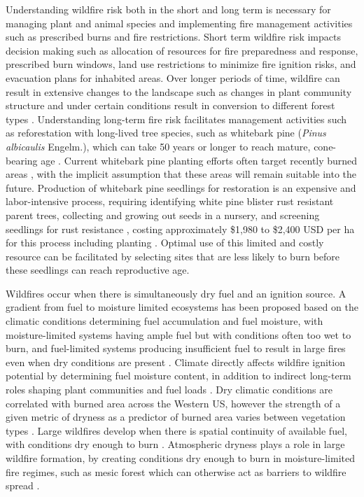 \documentclass[11p]{article}
\begin{document}
Understanding wildfire risk both in the short and long term is necessary for managing plant and animal species and implementing fire management activities such as prescribed burns and fire restrictions. Short term wildfire risk impacts decision making such as allocation of resources for fire preparedness and response, prescribed burn windows, land use restrictions to minimize fire ignition risks, and evacuation plans for inhabited areas. Over longer periods of time, wildfire can result in extensive changes to the landscape such as changes in plant community structure and under certain conditions result in conversion to different forest types \citep{coopWildfireDrivenForestConversion2020}. Understanding long-term fire risk facilitates management activities such as reforestation with long-lived tree species, such as whitebark pine (\textit{Pinus albicaulis} Engelm.), which can take 50 years or longer to reach mature, cone-bearing age \citep{tombackWhitebarkPineCommunities2001}. Current whitebark pine planting efforts often target recently burned areas \citep{keaneRangewideRestorationStrategy2012}, with the implicit assumption that these areas will remain suitable into the future. Production of whitebark pine seedlings for restoration is an expensive and labor-intensive process, requiring identifying white pine blister rust resistant parent trees, collecting and growing out seeds in a nursery, and screening seedlings for rust resistance \citep{tombackTammReviewCurrent2022}, costing approximately \$1,980 to \$2,400 USD per ha for this process including planting \citep{tombackMagnificentHighElevationFiveNeedle2011}. Optimal use of this limited and costly resource can be facilitated by selecting sites that are less likely to burn before these seedlings can reach reproductive age.

Wildfires occur when there is simultaneously dry fuel and an ignition source. A gradient from fuel to moisture limited ecosystems has been proposed based on the climatic conditions determining fuel accumulation and fuel moisture, with moisture-limited systems having ample fuel but with conditions often too wet to burn, and fuel-limited systems producing insufficient fuel to result in large fires even when dry conditions are present \citep{meynEnvironmentalDriversLarge2007}. Climate directly affects wildfire ignition potential by determining fuel moisture content, in addition to indirect long-term roles shaping plant communities and fuel loads \citep{littellReviewRelationshipsDrought2016}. Dry climatic conditions are correlated with burned area across the Western US, however the strength of a given metric of dryness as a predictor of burned area varies between vegetation types \citep{littellClimateWildfireArea2009}. Large wildfires develop when there is spatial continuity of available fuel, with conditions dry enough to burn %
\citep{millerConnectivityForestFuels2000}. Atmospheric dryness plays a role in large wildfire formation, by creating conditions dry enough to burn in moisture-limited fire regimes, such as mesic forest which can otherwise act as barriers to wildfire spread \citep{cawsonAtmosphericDrynessRemoves2024}. 
\end{document}
